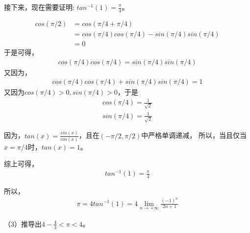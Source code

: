 \documentclass{article}
\begin{document}
接下来，现在需要证明: $tan^{-1}(1) = \frac{\pi}{4}$。

\begin{align*}
  cos(\pi/2) & = cos(\pi/4 + \pi/4)                          \\
             & = cos(\pi/4)cos(\pi/4) - sin(\pi/4)sin(\pi/4) \\
             & = 0
\end{align*}
于是可得，
\begin{align*}
  cos(\pi/4)cos(\pi/4) = sin(\pi/4)sin(\pi/4)
\end{align*}
又因为，
\begin{align*}
  cos(\pi/4)cos(\pi/4) + sin(\pi/4)sin(\pi/4) = 1
\end{align*}
又因为$cos(\pi/4) > 0, sin(\pi/4) > 0$，于是
\begin{align*}
  cos(\pi/4) = \frac{1}{\sqrt{2}} \\
  sin(\pi/4) = \frac{1}{\sqrt{2}}
\end{align*}

因为，$tan(x) = \frac{sin(x)}{cos(x)}$，且在$(-\pi/2, \pi/2)$中严格单调递减，
所以，当且仅当$x = \pi/4$时，$tan(x) = 1$。

综上可得，
\begin{align*}
  tan^{-1}(1) = \frac{\pi}{4}
\end{align*}

所以，
\begin{align*}
  \pi = 4tan^{-1}(1) = 4\lim\limits_{n \to +\infty} \frac{(-1)^n}{2n + 1}
\end{align*}

（3）推导出$4 - \frac{4}{3} < \pi < 4$。
\end{document}
